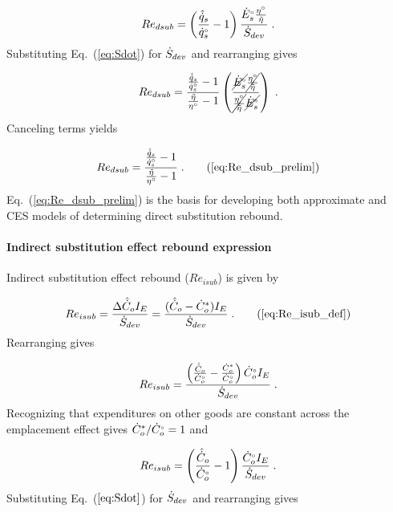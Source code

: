 \begin{equation}
  Re_{dsub} = \left( \frac{\hat{\dot{q}}_s}{{}{\dot{q}}^{\scriptscriptstyle \circ}_s} - 1  \right)
              \frac{{}{\dot{E}}^{\scriptscriptstyle \circ}_s \frac{{}{\eta}^{\scriptscriptstyle \circ}}{\tilde{\eta}}}{\dot{S}_{dev}} \; .
\end{equation}
%
Substituting Eq.~(\ref{eq:Sdot}) for $\dot{S}_{dev}$ and rearranging gives

\begin{equation}
  Re_{dsub} = \frac{\frac{\hat{\dot{q}}_s}{{}{\dot{q}}^{\scriptscriptstyle \circ}_s} - 1}{\frac{\tilde{\eta}}{{}{\eta}^{\scriptscriptstyle \circ}} - 1}
              \left( \frac{\cancel{{}{\dot{E}}^{\scriptscriptstyle \circ}_s} \cancel{\frac{{}{\eta}^{\scriptscriptstyle \circ}}{\tilde{\eta}}}    }{  \cancel{\frac{{}{\eta}^{\scriptscriptstyle \circ}}{\tilde{\eta}}}    \cancel{{}{\dot{E}}^{\scriptscriptstyle \circ}_s}} \right) \; .
\end{equation}
%
Canceling terms yields

\begin{equation}
  Re_{dsub} = \frac{\frac{\rasub{q}_s}{\rbempl{q}_s} - 1}{\frac{\amacro{\eta}}{\bempl{\eta}} - 1} \; .
                                                               \tag{\ref{eq:Re_dsub_prelim}}
\end{equation}
%
Eq.~(\ref{eq:Re_dsub_prelim}) is the basis for
developing both approximate and CES models of determining
direct substitution rebound.


\paragraph{Indirect substitution effect rebound expression}
\label{sec:Reisub_expression}

Indirect substitution effect rebound ($Re_{isub}$) is given by

\begin{equation}
  Re_{isub} = \frac{\Delta \rasub{C}_o I_E}{\Sdot} = \frac{(\rasub{C}_o - \rbsub{C}_{o}) I_E}{\Sdot} \; . \tag{\ref{eq:Re_isub_def}}
\end{equation}
%
Rearranging gives

\begin{equation}
  Re_{isub} = \frac{\left(\frac{\hat{\dot{C}}_o}{{}{\dot{C}}^{\scriptscriptstyle \circ}_o} - \frac{{\dot{C}}^*_o}{{}{\dot{C}}^{\scriptscriptstyle \circ}_o}  \right) {}{\dot{C}}^{\scriptscriptstyle \circ}_o I_E }{\dot{S}_{dev}} \; .
\end{equation}
%
Recognizing that expenditures on other goods are constant across the emplacement effect gives
${\dot{C}}^*_o/{}{\dot{C}}^{\scriptscriptstyle \circ}_o = 1$ and

\begin{equation}
  Re_{isub} = \left(\frac{\hat{\dot{C}}_o}{{}{\dot{C}}^{\scriptscriptstyle \circ}_o} - 1  \right) \frac{{}{\dot{C}}^{\scriptscriptstyle \circ}_o I_E }{\dot{S}_{dev}} \; .
\end{equation}
%
Substituting Eq.~($\ref{eq:Sdot}$) for $\dot{S}_{dev}$ and rearranging gives

